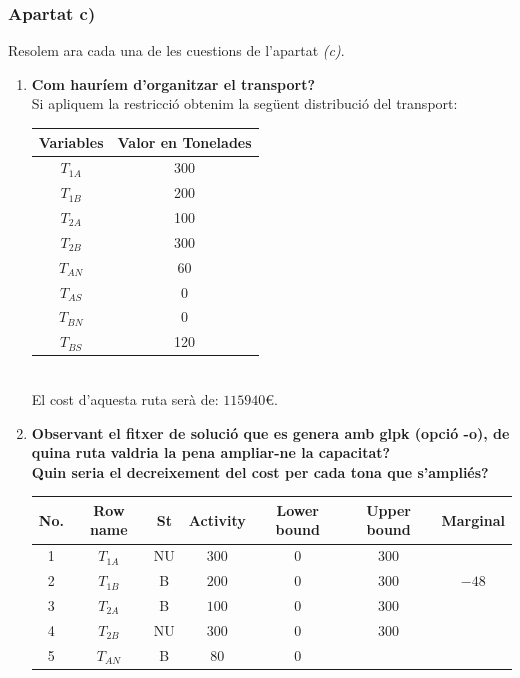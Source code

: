 \documentclass[a4paper, 11pt]{article}
\begin{document}
\subsubsection{Apartat c)}
Resolem ara cada una de les cuestions de l'apartat \textit{(c)}.
\begin{enumerate}
    \item \textbf{Com hauríem d’organitzar el transport?}\\
    Si apliquem la restricció obtenim la següent distribució del transport:
    \begin{table}[h]
    \centering
    \begin{tabular}{ c | c }
        \textbf{Variables} & \textbf{Valor en Tonelades} \\ \hline
        $T_{1A}$ & 300 \\ \hline
        $T_{1B}$ & 200 \\ \hline
        $T_{2A}$ & 100 \\ \hline
        $T_{2B}$ & 300 \\ \hline
        $T_{AN}$ & 60 \\ \hline
        $T_{AS}$ & 0 \\ \hline
        $T_{BN}$ & 0 \\ \hline
        $T_{BS}$ & 120 \\
    \end{tabular}
\end{table}\\
El cost d'aquesta ruta serà de: $115940$\euro.
    \item \textbf{Observant el fitxer de solució que es genera amb glpk (opció -o), de quina ruta
valdria la pena ampliar-ne la capacitat? \\
Quin seria el decreixement del cost per cada tona que s’ampliés?}
\begin{table}[h]
    \centering
    \begin{tabular}{ c | c | c | c | c | c | c }
        No. & Row name & St & Activity & Lower bound & Upper bound & Marginal \\\hline\hline
        1 & $T_{1A}$ & NU & $300$ & $0$ & $300$ &   \\ \hline 
        2 & $T_{1B}$ & B & $200$ & $0$ & $300$ & $-48$  \\\hline
        3 & $T_{2A}$ & B & $100$ & $0$ & $300$ &  \\\hline
        4 & $T_{2B}$ & NU & $300$ & $0$ & $300$ &  \\\hline
        5 & $T_{AN}$ & B & $80$ & $0$ &  & \\ \hline

\end{tabular}
\end{table}
\end{enumerate}
\end{document}
